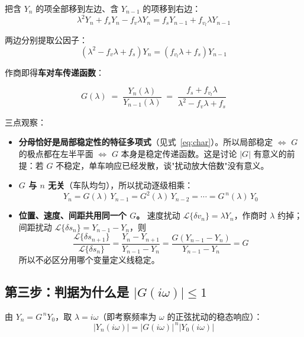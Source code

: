 \documentclass[11pt,a4paper,openany]{book}
\numberwithin{equation}{chapter}
\numberwithin{figure}{chapter}
\numberwithin{table}{chapter}
\begin{document}
把含 $Y_n$ 的项全部移到左边、含 $Y_{n-1}$ 的项移到右边：
\begin{equation}
\lambda^2 Y_n + f_s Y_n - f_v\lambda Y_n = f_s Y_{n-1} + f_{v_l}\lambda Y_{n-1}
\end{equation}

两边分别提取公因子：
\begin{equation}
\left(\lambda^2 - f_v\lambda + f_s\right) Y_n = \left(f_{v_l}\lambda + f_s\right) Y_{n-1}
\end{equation}

作商即得\textbf{车对车传递函数}：
\begin{tcolorbox}[keybox,title=\textbf{车对车传递函数}]
\begin{equation}
G(\lambda) \;=\; \frac{Y_n(\lambda)}{Y_{n-1}(\lambda)}
\;=\; \frac{f_s + f_{v_l}\lambda}{\lambda^2 - f_v\lambda + f_s}
\label{eq:G0}
\end{equation}
\end{tcolorbox}

三点观察：

\begin{itemize}[leftmargin=1.4em,itemsep=3pt]
\item \textbf{分母恰好是局部稳定性的特征多项式}（见式~\eqref{eq:char}）。所以局部稳定 $\iff$ $G$ 的极点都在左半平面 $\iff$ $G$ 本身是稳定传递函数。这是讨论 $\left|G\right|$ 有意义的前提：若 $G$ 不稳定，单车响应已经发散，谈"扰动放大倍数"没有意义。
\item \textbf{$G$ 与 $n$ 无关}（车队均匀），所以扰动逐级相乘：
\begin{equation}
Y_n = G(\lambda)\,Y_{n-1} = G^2(\lambda)\,Y_{n-2} = \cdots = G^{\,n}(\lambda)\,Y_0
\end{equation}
\item \textbf{位置、速度、间距共用同一个 $G$。} 速度扰动 $\mathcal{L}\{\delta v_n\} = \lambda Y_n$，作商时 $\lambda$ 约掉；间距扰动 $\mathcal{L}\{\delta s_n\} = Y_{n-1}-Y_n$，则
\[
\frac{\mathcal{L}\{\delta s_{n+1}\}}{\mathcal{L}\{\delta s_n\}}
= \frac{Y_n - Y_{n+1}}{Y_{n-1}-Y_n}
= \frac{G\left(Y_{n-1}-Y_n\right)}{Y_{n-1}-Y_n} = G
\]
所以不必区分用哪个变量定义线稳定。
\end{itemize}

\subsection{第三步：判据为什么是 $\left|G(i\omega)\right|\le1$}

由 $Y_n = G^{\,n}Y_0$，取 $\lambda = i\omega$（即考察频率为 $\omega$ 的正弦扰动的稳态响应）：
\begin{equation}
\left|Y_n(i\omega)\right| = \left|G(i\omega)\right|^{\,n}\left|Y_0(i\omega)\right|
\end{equation}
\end{document}
